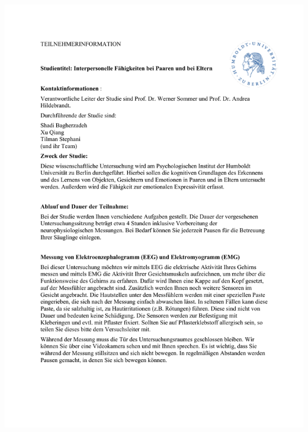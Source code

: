 \begin{center}
\includegraphics[page=4,scale=0.9,trim={70 0 0 110},clip]{"Appendix/consent_form_and_info_sheet"}
\end{center}



